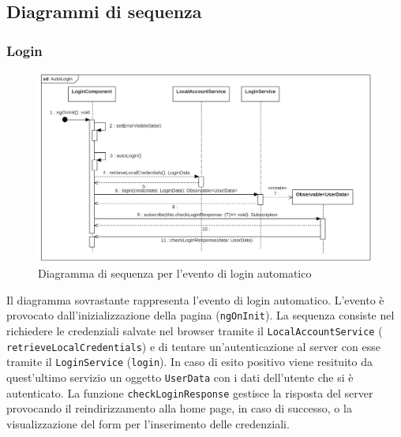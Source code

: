 \subsection{Diagrammi di sequenza}
\subsubsection{Login}
\begin{figure}[H]
	\centering
	\includegraphics[width=18cm]{res/images/webapp-autologin-diagrammaSequenza.png}
	\caption{Diagramma di sequenza per l'evento di login automatico}
	\label{fig:DiagrammaSequenzaAutoLogin}
\end{figure}
Il diagramma sovrastante rappresenta l'evento di login automatico. L'evento è provocato dall'inizializzazione della pagina (\texttt{ngOnInit}). La sequenza consiste nel richiedere le credenziali salvate nel browser tramite il \texttt{LocalAccountService} ( \texttt{retrieveLocalCredentials}) e di tentare un'autenticazione al server con esse tramite il \texttt{LoginService} (\texttt{login}). In caso di esito positivo viene resituito da quest'ultimo servizio un oggetto \texttt{UserData} con i dati dell'utente che si è autenticato. La funzione \texttt{checkLoginResponse} gestisce la risposta del server provocando il reindirizzamento alla home page, in caso di successo, o la visualizzazione del form per l'inserimento delle credenziali.

